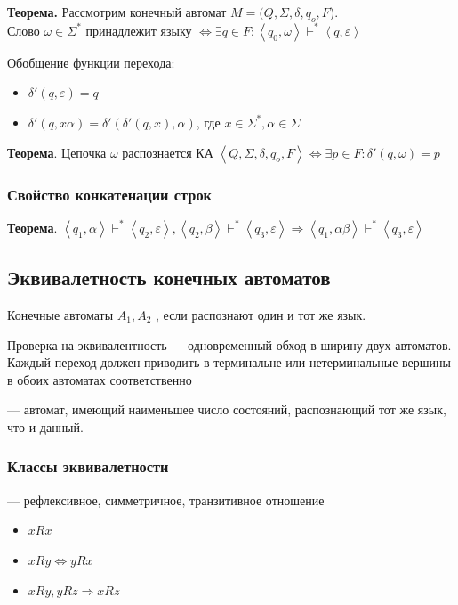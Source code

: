 \documentclass[a4paper, 14pt]{extarticle}
\begin{document}
\begin{tcolorbox}
    \textbf{Теорема.} Рассмотрим конечный автомат $M = (Q, \Sigma, \delta, q_o, F$).\\
    Слово $\omega \in \Sigma^*$ принадлежит языку $ \Leftrightarrow \exists q \in F: \left\langle q_0, \omega \right\rangle \vdash^* \left\langle q, \varepsilon \right\rangle $
\end{tcolorbox}

Обобщение функции перехода:
\begin{itemize}
    \item $\delta'(q, \varepsilon) = q$
    \item $\delta'(q, x \alpha) = \delta'(\delta'(q, x), \alpha)$, где $x \in \Sigma^*, \alpha \in \Sigma $
\end{itemize}

\begin{tcolorbox}
    \textbf{Теорема}. Цепочка $ \omega $ распознается КА $ \left\langle Q, \Sigma, \delta, q_o, F \right\rangle \Leftrightarrow \exists p \in F: \delta'(q, \omega) = p $
\end{tcolorbox}

\subsubsection*{Свойство конкатенации строк}
\begin{tcolorbox}
    \textbf{Теорема}. $ \left\langle q_1, \alpha \right\rangle \vdash^* \left\langle q_2, \varepsilon \right\rangle, \left\langle q_2, \beta \right\rangle \vdash^* \left\langle q_3, \varepsilon \right\rangle \Rightarrow \left\langle q_1, \alpha\beta \right\rangle \vdash^* \left\langle q_3, \varepsilon \right\rangle  $
\end{tcolorbox}

\subsection{Эквивалетность конечных автоматов}
Конечные автоматы $A_1, A_2$ , если распознают один и тот же язык.

Проверка на эквивалентность --- одновременный обход в ширину двух автоматов. Каждый переход должен приводить в терминальне или нетерминальные вершины в обоих автоматах соответственно

 --- автомат, имеющий наименьшее число состояний, распознающий тот же язык, что и данный. 

\subsubsection{Классы эквивалетности}
 --- рефлексивное, симметричное, транзитивное отношение
\begin{itemize}
    \item $xRx$
    \item $xRy \Longleftrightarrow yRx$
    \item $xRy, yRz \Rightarrow xRz$
\end{itemize}
\end{document}
